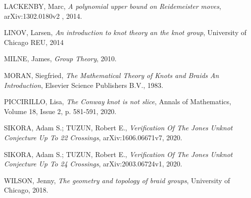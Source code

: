\documentclass[a4paper,portuguese,11pt,twoside, leqno]{book}
\makeatletter
\newcounter{braid}
\newcounter{strands}
\def\cross{%
	\@ifnextchar^{\message{Got sup}\cross@sup}{\cross@sub}}
\def\cross@sup^#1_#2{\render@cross{#2}{#1}}
\def\cross@sub_#1{\@ifnextchar^{\cross@@sub{#1}}{\render@cross{#1}{1}}}
\def\cross@@sub#1^#2{\render@cross{#1}{#2}}
\def\render@cross#1#2{
	\def\strand{#1}
	\def\crossing{#2}
	\pgfmathsetmacro{\cross@y}{-\value{braid}*\braid@h}
	\pgfmathtruncatemacro{\nextstrand}{#1+1}
	\foreach \thread in {1,...,\value{strands}}
	{
		\pgfmathsetmacro{\strand@x}{\thread * \braid@w}
		\ifnum\thread=\strand
		\pgfmathsetmacro{\over@x}{\strand * \braid@w + .5*(1 - \crossing) * \braid@w}
		\pgfmathsetmacro{\under@x}{\strand * \braid@w + .5*(1 + \crossing) * \braid@w}
		\draw[braid] \pgfkeysvalueof{/tikz/braid start} +(\under@x pt,\cross@y pt) to[out=-90,in=90] +(\over@x pt,\cross@y pt -\braid@h);
		\draw[braid] \pgfkeysvalueof{/tikz/braid start} +(\over@x pt,\cross@y pt) to[out=-90,in=90] +(\under@x pt,\cross@y pt -\braid@h);
		\else
		\ifnum\thread=\nextstrand
		\else
		\draw[braid] \pgfkeysvalueof{/tikz/braid start} ++(\strand@x pt,\cross@y pt) -- ++(0,-\braid@h);
		\fi
		\fi
	}
	\stepcounter{braid}
}
\newcommand{\braid}[2][]{%
	\begingroup
	\pgfkeys{/tikz/strands=2}
	\tikzset{#1}
	\pgfkeysgetvalue{/tikz/braid width}{\braid@w}
	\pgfkeysgetvalue{/tikz/braid height}{\braid@h}
	\setcounter{braid}{0}
	\let\sigma=\cross
	#2
	\endgroup
}
\theoremstyle{definition}
\makeatother
\begin{document}
\begin{thebibliography}{99}
		LACKENBY, Marc, \textit{A polynomial upper bound on Reidemeister moves}, arXiv:1302.0180v2 , 2014.
		
		LINOV, Larsen, \textit{An introduction to knot theory an the knot group}, University of Chicago REU, 2014
		
		MILNE, James, \textit{Group Theory}, 2010.
		
		MORAN, Siegfried, \textit{The Mathematical Theory of Knots and Braids An Introduction}, Elsevier Science Publishers B.V., 1983.
		
		PICCIRILLO, Lisa, \textit{The Conway knot is not slice}, Annals of Mathematics, Volume 18, Issue 2, p. 581-591, 2020. 
		
		SIKORA, Adam S.; TUZUN, Robert E., \textit{Verification Of The Jones Unknot Conjecture Up To 22 Crossings}, arXiv:1606.06671v7, 2020.
		
		SIKORA, Adam S.; TUZUN, Robert E., \textit{Verification Of The Jones Unknot Conjecture Up To 24 Crossings}, arXiv:2003.06724v1, 2020.
		
		WILSON, Jenny, \textit{The geometry and topology of braid groups}, University of Chicago, 2018.
		
		
	\end{thebibliography}
	
	
	
	
	
	
	
	
	
	
\end{document}
